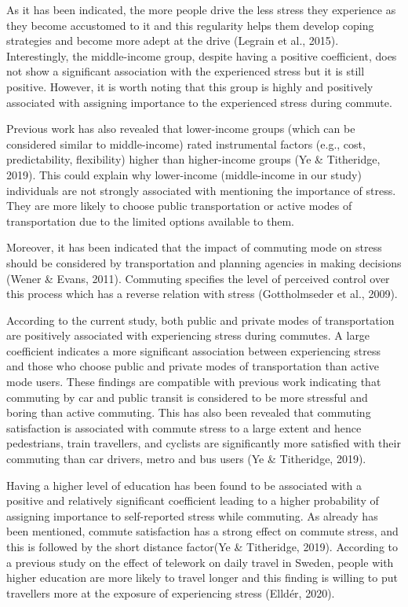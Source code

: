 \documentclass[
11pt, %
oneside, %
english, %
singlespacing, %
]{macthesis} %
\begin{document}
As it has been indicated, the more people drive the less stress they experience as they become accustomed to it and this regularity helps them develop coping strategies and become more adept at the drive (Legrain et al., 2015). Interestingly, the middle-income group, despite having a positive coefficient, does not show a significant association with the experienced stress but it is still positive. However, it is worth noting that this group is highly and positively associated with assigning importance to the experienced stress during commute.

Previous work has also revealed that lower-income groups (which can be considered similar to middle-income) rated instrumental factors (e.g., cost, predictability, flexibility) higher than higher-income groups (Ye \& Titheridge, 2019). This could explain why lower-income (middle-income in our study) individuals are not strongly associated with mentioning the importance of stress. They are more likely to choose public transportation or active modes of transportation due to the limited options available to them.

Moreover, it has been indicated that the impact of commuting mode on stress should be considered by transportation and planning agencies in making decisions (Wener \& Evans, 2011). Commuting specifies the level of perceived control over this process which has a reverse relation with stress (Gottholmseder et al., 2009).

According to the current study, both public and private modes of transportation are positively associated with experiencing stress during commutes. A large coefficient indicates a more significant association between experiencing stress and those who choose public and private modes of transportation than active mode users. These findings are compatible with previous work indicating that commuting by car and public transit is considered to be more stressful and boring than active commuting. This has also been revealed that commuting satisfaction is associated with commute stress to a large extent and hence pedestrians, train travellers, and cyclists are significantly more satisfied with their commuting than car drivers, metro and bus users (Ye \& Titheridge, 2019).

Having a higher level of education has been found to be associated with a positive and relatively significant coefficient leading to a higher probability of assigning importance to self-reported stress while commuting. As already has been mentioned, commute satisfaction has a strong effect on commute stress, and this is followed by the short distance factor(Ye \& Titheridge, 2019). According to a previous study on the effect of telework on daily travel in Sweden, people with higher education are more likely to travel longer and this finding is willing to put travellers more at the exposure of experiencing stress (Elldér, 2020).
\end{document}
